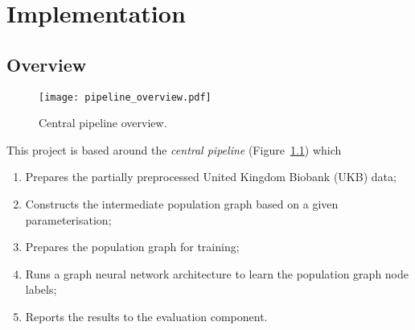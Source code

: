 \chapter{Implementation}


\section{Overview}

\begin{figure}[h]
    \texttt{[image: pipeline\_overview.pdf]}
    \caption{Central pipeline overview.}\label{pipeline-overview}
\end{figure}

This project is based around the \textit{central pipeline} (Figure~\ref{pipeline-overview}) which 
\begin{enumerate}
    \item Prepares the partially preprocessed United Kingdom Biobank (UKB) data;
    \item Constructs the intermediate population graph based on a given parameterisation;
    \item Prepares the population graph for training;
    \item Runs a graph neural network architecture to learn the population graph node labels;
    \item Reports the results to the evaluation component.
\end{enumerate}

